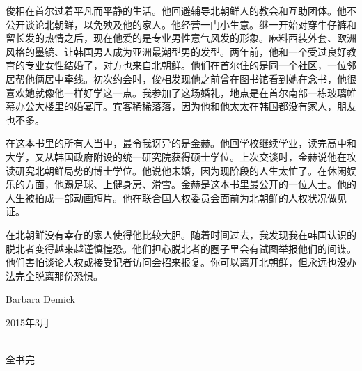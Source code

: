 俊相在首尔过着平凡而平静的生活。他回避辅导北朝鲜人的教会和互助团体。他不公开谈论北朝鲜，以免殃及他的家人。他经营一门小生意。继一开始对穿牛仔裤和留长发的热情之后，现在他爱的是专业男性意气风发的形象。麻料西装外套、欧洲风格的墨镜、让韩国男人成为亚洲最潮型男的发型。两年前，他和一个受过良好教育的专业女性结婚了，对方也来自北朝鲜。他们在首尔住的是同一个社区，一位邻居帮他俩居中牵线。初次约会时，俊相发现他之前曾在图书馆看到她在念书，他很喜欢她就像他一样好学这一点。我参加了这场婚礼，地点是在首尔南部一栋玻璃帷幕办公大楼里的婚宴厅。宾客稀稀落落，因为他和他太太在韩国都没有家人，朋友也不多。

在这本书里的所有人当中，最令我讶异的是金赫。他回学校继续学业，读完高中和大学，又从韩国政府附设的统一研究院获得硕士学位。上次交谈时，金赫说他在攻读研究北朝鲜局势的博士学位。他说他未婚，因为现阶段的人生太忙了。在休闲娱乐的方面，他踢足球、上健身房、滑雪。金赫是这本书里最公开的一位人士。他的人生被拍成一部动画短片。他在联合国人权委员会面前为北朝鲜的人权状况做见证。

在北朝鲜没有幸存的家人使得他比较大胆。随着时间过去，我发现我在韩国认识的脱北者变得越来越谨慎惶恐。他们担心脱北者的圈子里会有试图举报他们的间谍。他们害怕谈论人权或接受记者访问会招来报复。你可以离开北朝鲜，但永远也没办法完全脱离那份恐惧。

\begin{flushright}
	Barbara Demick

	2015年3月
\end{flushright}


\begin{center}
	\begin{center}
		\textcolor{PinYinColor}
		{\faBookmark\\
			全书完\\}
	\end{center}
\end{center}
